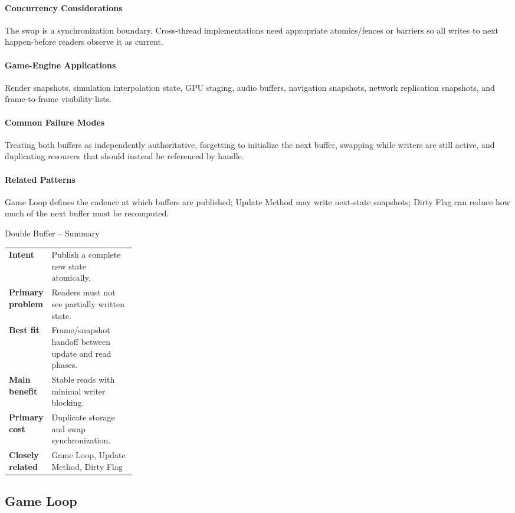 \documentclass[11pt]{article}
\begin{document}
\paragraph{Concurrency Considerations} The swap is a synchronization boundary. Cross-thread implementations need appropriate atomics/fences or barriers so all writes to next happen-before readers observe it as current.
\paragraph{Game-Engine Applications} Render snapshots, simulation interpolation state, GPU staging, audio buffers, navigation snapshots, network replication snapshots, and frame-to-frame visibility lists.
\paragraph{Common Failure Modes} Treating both buffers as independently authoritative, forgetting to initialize the next buffer, swapping while writers are still active, and duplicating resources that should instead be referenced by handle.
\paragraph{Related Patterns} Game Loop defines the cadence at which buffers are published; Update Method may write next-state snapshots; Dirty Flag can reduce how much of the next buffer must be recomputed.

\begin{patternsummary}{Double Buffer -- Summary}
\begin{tabularx}{\linewidth}{@{}>{\bfseries}p{0.25\linewidth}X@{}}
Intent & Publish a complete new state atomically. \\
Primary problem & Readers must not see partially written state. \\
Best fit & Frame/snapshot handoff between update and read phases. \\
Main benefit & Stable reads with minimal writer blocking. \\
Primary cost & Duplicate storage and swap synchronization. \\
Closely related & Game Loop, Update Method, Dirty Flag \\
\end{tabularx}
\end{patternsummary}

\subsection{Game Loop}\label{pat:game-loop}
\end{document}

